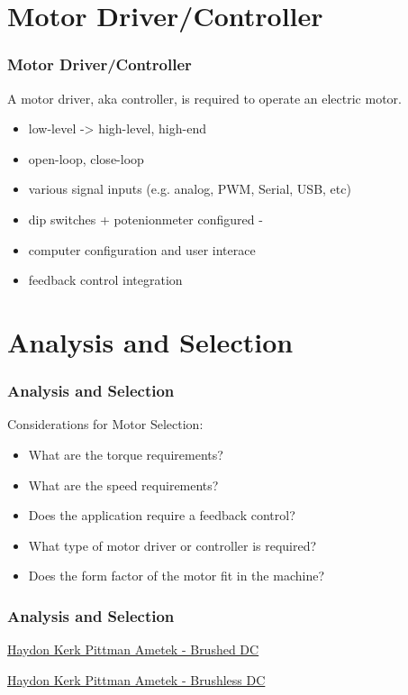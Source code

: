\documentclass[fleqn]{beamer} %
\newcommand{\sectiontitleIV}{Motor Driver/Controller}
\newcommand{\sectiontitleV}{Analysis and Selection}
\begin{document}
	
\section{\sectiontitleIV}	

	    \begin{frame}[label=sectionIV] \small
		\frametitle{\sectiontitleIV}    
  
	  		A motor driver, aka controller, is required to operate an electric motor.

	  		\begin{itemize}
	  			\item low-level -> high-level, high-end
	  			\item open-loop, close-loop
	  			\item various signal inputs (e.g. analog, PWM, Serial, USB, etc)
	  			\item dip switches + potenionmeter configured -
	  			\item computer configuration and user interace
	  			\item feedback control integration
	  		\end{itemize}

		\end{frame}


\section{\sectiontitleV}	

	    \begin{frame}[label=sectionV] \small
		\frametitle{\sectiontitleV}    
  
	  		Considerations for Motor Selection:
	  		\begin{itemize}
	  			\item What are the torque requirements?
	  			\item What are the speed requirements?
	  			\item Does the application require a feedback control?
	  			\item What type of motor driver or controller is required?
	  			\item Does the form factor of the motor fit in the machine?
	  		\end{itemize}



		\end{frame}

	    \begin{frame}[label=sectionV] \small
		\frametitle{\sectiontitleV}    
  
  		\href{https://www.haydonkerkpittman.com/products/motors/brushed-dc-motors/dc054b}{Haydon Kerk Pittman Ametek - Brushed DC }

  		\href{https://www.haydonkerkpittman.com/products/motors/brushless-dc-motors/ec057b}{Haydon Kerk Pittman Ametek - Brushless DC }



		\end{frame}
		
\end{document}
